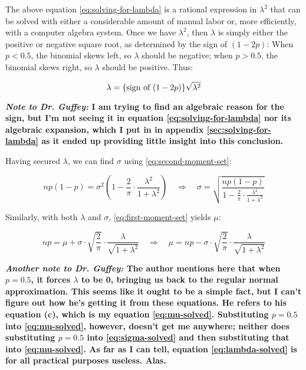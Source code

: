 \documentclass{article}
\begin{document}
The above equation \eqref{eq:solving-for-lambda} is a rational expression in
$\lambda^2$ that can be solved with either a considerable amount of manual
labor or, more efficiently, with a computer algebra system. Once we have
$\lambda^2$, then $\lambda$ is simply either the positive or negative square
root, as determined by the sign of $(1-2p)$: When $p < 0.5$, the binomial skews
left, so $\lambda$ should be negative; when $p > 0.5$, the binomial skews
right, so $\lambda$ should be positive. Thus:

\begin{equation}
  \label{eq:lambda-solved}
  \lambda = \textnormal{\{sign of $(1-2p)$\}} \sqrt{\lambda^2}
\end{equation}

\textbf{\textit{Note to Dr. Guffey:} I am trying to find an algebraic reason
for the sign, but I'm not seeing it in equation \eqref{eq:solving-for-lambda}
nor its algebraic expansion, which I put in in appendix
\ref{sec:solving-for-lambda} as it ended up providing little insight into this
conclusion.}

Having secured $\lambda$, we can find $\sigma$ using
\eqref{eq:second-moment-set}:

\begin{equation}
  \label{eq:sigma-solved}
  np(1-p) = \sigma^2 \left( 1 - \frac{2}{\pi} \cdot \frac{\lambda^2}{1 + \lambda^2} \right) \quad\Rightarrow\quad
  \sigma = \sqrt{\frac{np(1-p)}{1 - \frac{2}{\pi} \cdot \frac{\lambda^2}{1 + \lambda^2}}}
\end{equation}

Similarly, with both $\lambda$ and $\sigma$, \eqref{eq:first-moment-set} yields
$\mu$:

\begin{equation}
  \label{eq:mu-solved}
  np = \mu + \sigma \cdot \sqrt{\frac{2}{\pi}} \cdot \frac{\lambda}{\sqrt{1 + \lambda^2}} \quad\Rightarrow\quad
  \mu = np - \sigma \cdot \sqrt{\frac{2}{\pi}} \cdot \frac{\lambda}{\sqrt{1 + \lambda^2}}
\end{equation}

\textbf{\textit{Another note to Dr. Guffey:} The author mentions here that when
$p=0.5$, it forces $\lambda$ to be 0, bringing us back to the regular normal
approximation. This seems like it ought to be a simple fact, but I can't figure
out how he's getting it from these equations. He refers to his equation (c),
which is my equation \eqref{eq:mu-solved}. Substituting $p=0.5$ into
\eqref{eq:mu-solved}, however, doesn't get me anywhere; neither does
substituting $p=0.5$ into \eqref{eq:sigma-solved} and then substituting that
into \eqref{eq:mu-solved}. As far as I can tell, equation
\eqref{eq:lambda-solved} is for all practical purposes useless. Alas.}
\end{document}
